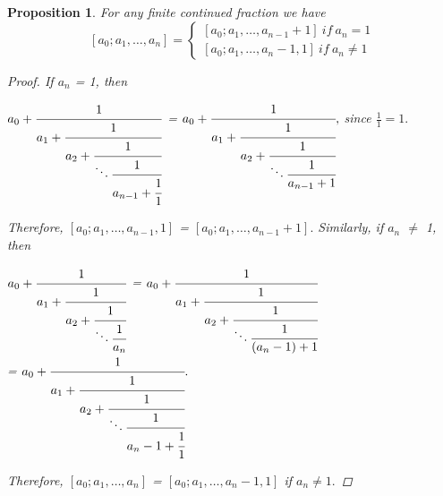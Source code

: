 \documentclass[11pt]{amsart}
\theoremstyle{plain}
\newtheorem{prop}{Proposition}
\theoremstyle{definition}
\begin{document}
\begin{prop}  For any finite continued fraction we have
$$[a_{0};a_{1},\dots,a_{n}] = \left\{\begin{matrix}
[a_{0};a_{1},\dots,a_{n-1}+1]\: if\: a_n = 1\\
[a_{0};a_{1},\dots,a_{n}-1,1]\: if\: a_n \neq 1
\end{matrix}\right.$$

\begin{proof}  If $a_n$ = 1, then
\begin{center}
$a_0 + \cfrac{1}{a_1
          + \cfrac{1}{a_2
          + \cfrac{1}{\ddots \cfrac{1}{a_{n-1} + \cfrac{1}{1}} } } }$ = $a_0 + \cfrac{1}{a_1
          + \cfrac{1}{a_2
          + \cfrac{1}{\ddots \cfrac{1}{a_{n-1} + 1} } } }, $ since $\frac{1}{1}=1. $
\end{center}
Therefore, $[a_{0};a_{1},\dots,a_{n-1},1]$ = $[a_{0};a_{1},\dots,a_{n-1} + 1].$  Similarly, if $a_n$ $\neq$ 1, then
\begin{center}
$a_0 + \cfrac{1}{a_1
          + \cfrac{1}{a_2
          + \cfrac{1}{\ddots \cfrac{1}{a_{n}} } } }$ = $a_0 + \cfrac{1}{a_1
          + \cfrac{1}{a_2
          + \cfrac{1}{\ddots \cfrac{1}{(a_{n}-1) + 1} } } }$\\ = $a_0 + \cfrac{1}{a_1
          + \cfrac{1}{a_2
          + \cfrac{1}{\ddots \cfrac{1}{a_{n} - 1 + \cfrac{1}{1}} } } }.$
\end{center}

\noindent Therefore,  $[a_{0};a_{1},\dots,a_{n}]$ = $[a_{0};a_{1},\dots,a_{n} - 1,1]$ if $a_n \neq 1. $
\end{proof}
\end{prop}
\medskip
\end{document}
